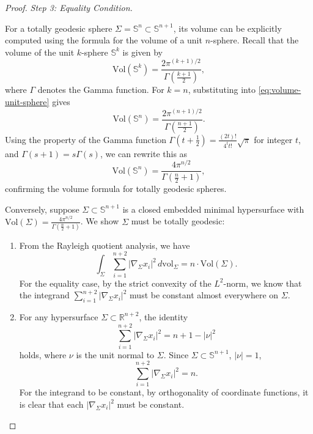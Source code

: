 \documentclass[a4, 12pt]{amsart}
\numberwithin{equation}{section} \numberwithin{equation}{section}
\begin{document}
\begin{proof}
\textit{Step 3: Equality Condition.}

For a totally geodesic sphere $\Sigma = \mathbb{S}^n \subset \mathbb{S}^{n+1}$, its volume can be explicitly computed using the formula for the volume of a unit $n$-sphere. Recall that the volume of the unit $k$-sphere $\mathbb{S}^k$ is given by
\begin{equation}\label{eq:volume-unit-sphere}
\text{Vol}(\mathbb{S}^k) = \frac{2\pi^{(k+1)/2}}{\Gamma\left(\frac{k+1}{2}\right)},
\end{equation}
where $\Gamma$ denotes the Gamma function. For $k = n$, substituting into \eqref{eq:volume-unit-sphere} gives
\[
\text{Vol}(\mathbb{S}^n) = \frac{2\pi^{(n+1)/2}}{\Gamma\left(\frac{n+1}{2}\right)}.
\]
Using the property of the Gamma function $\Gamma\left(t + \frac{1}{2}\right) = \frac{(2t)!}{4^t t!}\sqrt{\pi}$ for integer $t$, and $\Gamma(s + 1) = s\Gamma(s)$, we can rewrite this as
\[
\text{Vol}(\mathbb{S}^n) = \frac{4\pi^{n/2}}{\Gamma\left(\frac{n}{2} + 1\right)},
\]
confirming the volume formula for totally geodesic spheres.


Conversely, suppose $\Sigma \subset \mathbb{S}^{n+1}$ is a closed embedded minimal hypersurface with $\text{Vol}(\Sigma) = \frac{4\pi^{n/2}}{\Gamma\left(\frac{n}{2} + 1\right)}$. We show $\Sigma$ must be totally geodesic:

\begin{enumerate}
    \item[(i)] From the Rayleigh quotient analysis, we have
    \begin{equation}\label{eq:sum-nabla-xi}
    \int_\Sigma \sum_{i=1}^{n+2} |\nabla_\Sigma x_i|^2 \, d\mathrm{vol}_\Sigma = n \cdot \text{Vol}(\Sigma).
    \end{equation}
    For the equality case, by the strict convexity of the $L^2$-norm, we know that the integrand $\sum_{i=1}^{n+2} |\nabla_\Sigma x_i|^2$ must be constant almost everywhere on $\Sigma$.

    \item[(ii)] For any hypersurface $\Sigma \subset \mathbb{R}^{n+2}$, the identity $$\sum_{i=1}^{n+2} |\nabla_\Sigma x_i|^2 = n + 1 - |\nu|^2$$ holds, where $\nu$ is the unit normal to $\Sigma$. Since $\Sigma \subset \mathbb{S}^{n+1}$, $|\nu| = 1$,
    \begin{equation}\label{eq:sum-nabla-xi-2}
    \sum_{i=1}^{n+2} |\nabla_\Sigma x_i|^2 = n.
    \end{equation}
    For the integrand to be constant, by orthogonality of coordinate functions, it is clear that each $|\nabla_\Sigma x_i|^2$ must be constant.


\end{enumerate}
\end{proof}
\end{document}
